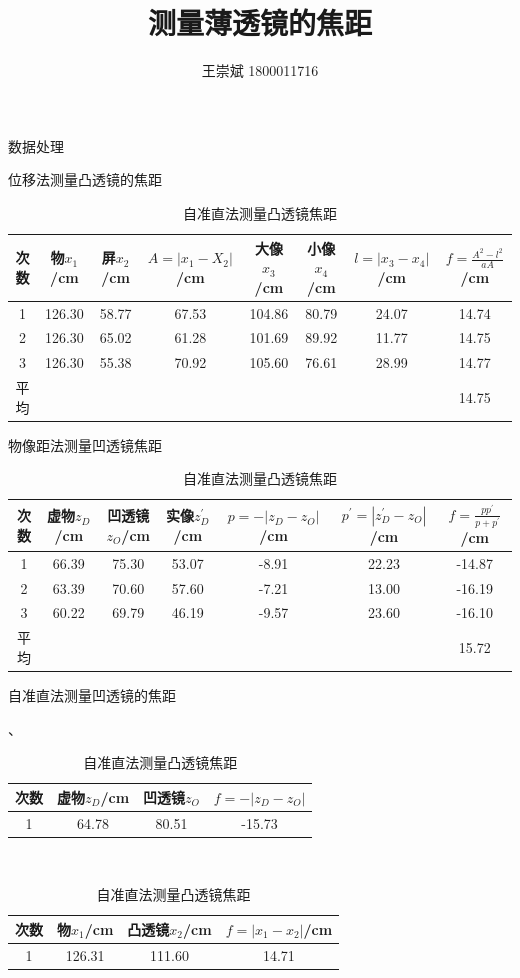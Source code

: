 \documentclass[a4paper]{ctexart}
\title{\textbf{测量薄透镜的焦距}}
\author{王崇斌 1800011716}
\date{}
\makeatletter
\renewcommand{\section}{\@startsection{section}{1}{0mm}
	{-\baselineskip}{0.5\baselineskip}{\bf\leftline}}
\makeatother
\begin{document}
	\pagestyle{fancy}
	\chead{}
	\rhead{}
	\maketitle
	\thispagestyle{fancy}
	\section{\large{数据处理}}
		\begin{table}[h]
			\centering
			\caption{位移法测量凸透镜的焦距}
			\label{位移法测凸透镜}
			 \begin{tabular}{cccccccc}
			 	\toprule
			 	次数 & 物$x_1$/cm & 屏$x_2$/cm & $A = |x_1 - X_2|$/cm & 大像$x_3$/cm &
			 	 小像$x_4$/cm & $l = |x_3 - x_4|$/cm & $f = \frac{A^{2} - l^{2}}{aA}$/cm \\
			 	\midrule
			 	1 & 126.30 & 58.77 & 67.53 & 104.86 & 80.79 & 24.07 & 14.74\\
			 	2 & 126.30 & 65.02 & 61.28 & 101.69 & 89.92 & 11.77 & 14.75\\
			 	3 & 126.30 & 55.38 & 70.92 & 105.60 & 76.61 & 28.99 & 14.77\\
			 	平均 & & & & & & & 14.75\\
			 	\bottomrule
			 \end{tabular}
			\centering
			\caption{物像距法测量凹透镜焦距}
			\label{物像距法测量凹透镜焦距}
			\begin{tabular}{ccccccc}
				\toprule
				次数 & 虚物$z_D$/cm & 凹透镜$z_O$/cm & 实像$z_D^{'}$/cm & $p = - |z_D - z_O|$/cm & 
				$p^{'} = |z_D^{'} - z_O|$/cm & $f = \frac{pp^{'}}{p + p^{'}}$/cm\\
				\midrule
				1 & 66.39 & 75.30 & 53.07 & -8.91 & 22.23 & -14.87\\
				2 & 63.39 & 70.60 & 57.60 & -7.21 & 13.00 & -16.19\\
				3 & 60.22 & 69.79 & 46.19 & -9.57 & 23.60 & -16.10\\
				平均 & & & & & & 15.72\\
				\bottomrule
			\end{tabular}
			\centering
			\caption{自准直法测量凹透镜的焦距}
			\label{自准直法测量凹透镜焦距}、
			\begin{tabular}{cccc}
				\toprule
				次数 & 虚物$z_D$/cm & 凹透镜$z_O$ & $f = -|z_D - z_O|$\\
				\midrule
				1 & 64.78 & 80.51 & -15.73\\
				\bottomrule
			\end{tabular}\\
			\centering
			\caption{自准直法测量凸透镜焦距}
			\label{自准直法测凸透镜}
			\begin{tabular}{cccc}
				\toprule
				次数 & 物$x_1$/cm & 凸透镜$x_2$/cm & $f = |x_1 - x_2|$/cm\\
				\midrule
				1 & 126.31 & 111.60 & 14.71\\
				\bottomrule
			\end{tabular}
		\end{table}
\end{document}
